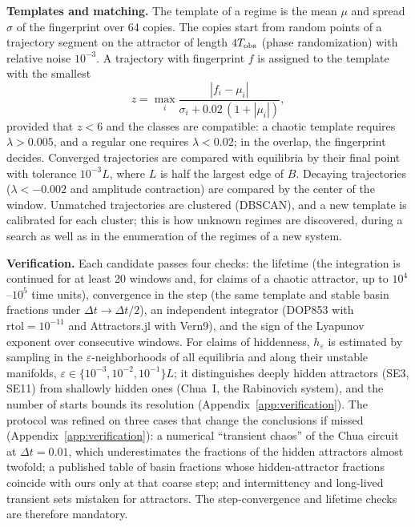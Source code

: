 \textbf{Templates and matching.} The template of a regime is the mean $\mu$ and spread $\sigma$ of the fingerprint over 64 copies. The copies start from random points of a trajectory segment on the attractor of length $4T_{\rm obs}$ (phase randomization) with relative noise $10^{-3}$. A trajectory with fingerprint $f$ is assigned to the template with the smallest
\begin{equation}
z=\max_i\frac{|f_i-\mu_i|}{\sigma_i+0.02\,(1+|\mu_i|)},
\label{eq:z}
\end{equation}
provided that $z<6$ and the classes are compatible: a chaotic template requires $\lambda>0.005$, and a regular one requires $\lambda<0.02$; in the overlap, the fingerprint decides. Converged trajectories are compared with equilibria by their final point with tolerance $10^{-3}L$, where $L$ is half the largest edge of $B$. Decaying trajectories ($\lambda<-0.002$ and amplitude contraction) are compared by the center of the window. Unmatched trajectories are clustered (DBSCAN), and a new template is calibrated for each cluster; this is how unknown regimes are discovered, during a search as well as in the enumeration of the regimes of a new system.

\textbf{Verification.} Each candidate passes four checks: the lifetime (the integration is continued for at least 20 windows and, for claims of a chaotic attractor, up to $10^4$--$10^5$ time units), convergence in the step (the same template and stable basin fractions under $\Delta t\to\Delta t/2$), an independent integrator (DOP853\cite{Hairer1993} with $\mathrm{rtol}=10^{-11}$ and Attractors.jl with Vern9), and the sign of the Lyapunov exponent over consecutive windows. For claims of hiddenness, $h_\varepsilon$ is estimated by sampling in the $\varepsilon$-neighborhoods of all equilibria and along their unstable manifolds, $\varepsilon\in\{10^{-3},10^{-2},10^{-1}\}L$; it distinguishes deeply hidden attractors (SE3, SE11) from shallowly hidden ones (Chua~I, the Rabinovich system), and the number of starts bounds its resolution (Appendix~\ref{app:verification}). The protocol was refined on three cases that change the conclusions if missed (Appendix~\ref{app:verification}): a numerical ``transient chaos'' of the Chua circuit at $\Delta t=0.01$, which underestimates the fractions of the hidden attractors almost twofold; a published table of basin fractions whose hidden-attractor fractions coincide with ours only at that coarse step; and intermittency and long-lived transient sets mistaken for attractors. The step-convergence and lifetime checks are therefore mandatory.
